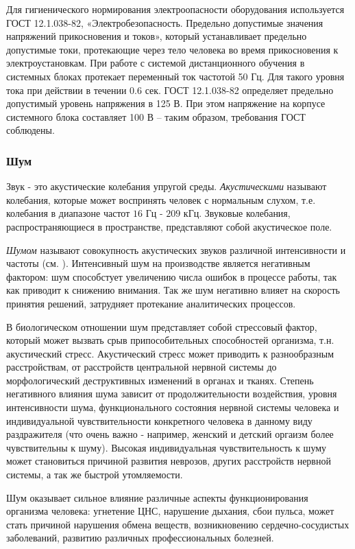Для гигиенического нормирования электроопасности оборудования ис\-пользуется ГОСТ 12.1.038-82, «Электробезопасность. Предельно допустимые значе\-ния напряжений  прикос\-новения и токов», который устанавливает пре\-дельно допустимые токи, протекающие через тело человека во время при\-косновения к электроустановкам.
При работе с системой дистанционного обу\-чения в сис\-темных блоках протекает переменный ток частотой 50 Гц. Для такого уровня тока при действии в течении 0.6 сек. ГОСТ 12.1.038-82 опреде\-ляет предельно допустимый уровень напряжения в 125 В. При этом напря\-жение на корпусе системного блока составляет 100 В – таким образом, требо\-вания ГОСТ соблюдены.

\subsubsection{Шум}

Звук - это акустические колебания упругой среды. {\itshape Акустическими} на\-зывают колебания, которые может воспринять человек с нормальным слухом, т.е. колебания в диапазоне частот $16$ Гц - $209$ кГц. Звуковые колебания, распро\-страняющиеся в пространстве, предста\-вляют собой акустическое поле.

{\itshape Шумом} называют совокупность акустических звуков различной интен\-сивности и часто\-ты (см. \cite{10.}). Интенсивный шум на производстве является негативным фактором: шум способстует увеличению числа ошибок в процессе работы, так как приводит к снижению внимания. Так же шум негативно влияет на скорость принятия решений, затрудняет протекание аналитических процессов.

В биологическом отношении шум представляет собой стрессовый фактор, который может вызвать срыв припособительных способностей организма, т.н. акустический стресс. Акустический стресс может приводить к разнообразным расстройствам, от расстройств центральной нервной системы до морфоло\-гический деструктивных изменений в органах и тканях. Степень негативного влияния шума зависит от продолжительности воздействия, уровня интенсив\-ности шума, функционального состояния нервной системы человека и индиви\-дуальной чувствительности конкретного человека в данному виду раздражи\-теля (что очень важно - например, женский и детский оргаизм более чувстви\-тельны к шуму). Высокая индивидуальная чувствительность к шуму может становиться причиной развития неврозов, других расстройств нервной сис\-темы, а так же быстрой утомляемости.

Шум оказывает сильное влияние различные аспекты функционирования организма человека: угнетение ЦНС, нарушение дыхания, сбои пульса, может стать причиной нарушения обмена веществ, возникновению сердечно-сосу\-дистых заболеваний, развитию различных профессиональных болезней.

